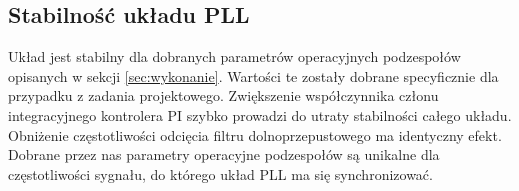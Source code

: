 \subsection{Stabilność układu PLL}
Układ jest stabilny dla dobranych parametrów operacyjnych podzespołów opisanych
w sekcji \ref{sec:wykonanie}. Wartości te zostały dobrane specyficznie dla
przypadku z zadania projektowego. Zwiększenie współczynnika członu
integracyjnego kontrolera PI szybko prowadzi do utraty stabilności całego
układu. Obniżenie częstotliwości odcięcia filtru dolnoprzepustowego ma
identyczny efekt. Dobrane przez nas parametry operacyjne podzespołów są unikalne
dla częstotliwości sygnału, do którego układ PLL ma się synchronizować.
